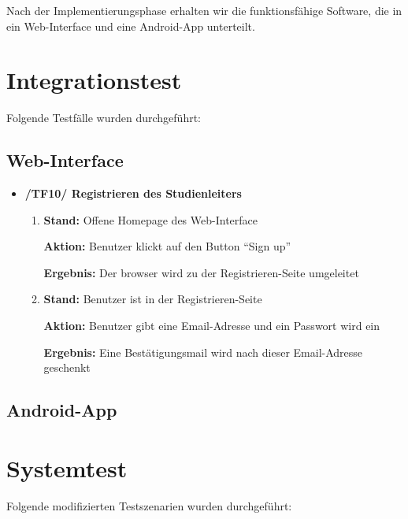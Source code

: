 \documentclass[a4paper]{scrreprt}
\begin{document}
        Nach der Implementierungsphase erhalten wir die funktionsf\"ahige Software, die in ein Web-Interface und eine Android-App unterteilt. 


			
                
      \newpage
      \chapter{Integrationstest}
      Folgende Testf\"alle wurden durchgef\"uhrt:
      
      
	      \section{Web-Interface}
		      \begin{itemize}
		          \item \textbf{/TF10/ Registrieren des Studienleiters}
		          \begin{enumerate}
		               \item \par \textbf{Stand: }Offene Homepage des Web-Interface
		                \par \textbf{Aktion: }Benutzer klickt auf den Button ``Sign up''
		                \par \textbf{Ergebnis: }Der browser wird zu der Registrieren-Seite umgeleitet
			            \item \par \textbf{Stand: }Benutzer ist in der Registrieren-Seite
		                \par \textbf{Aktion: }Benutzer gibt eine Email-Adresse und ein Passwort wird ein
		                \par \textbf{Ergebnis: }Eine Bestätigungsmail wird nach dieser Email-Adresse geschenkt
		           \end{enumerate}
		       \end{itemize}
	      
	      
	      \section{Android-App} 
	      
	  
	  \newpage
	  \chapter{Systemtest}         
	  Folgende modifizierten Testszenarien wurden durchgef\"uhrt:
	  
\end{document}
